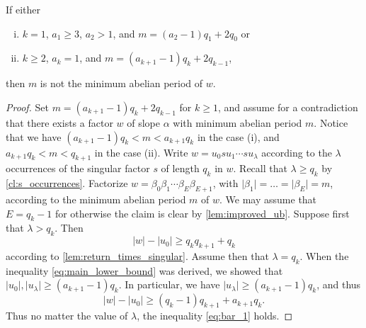 \documentclass[a4paper,fleqn]{article}
\providecommand{\abs}[1]{\lvert#1\rvert}
\begin{document}
  \begin{lemma}\label{lem:cases_2_3}
    If either
    \begin{enumerate}[(i)]
      \item $k = 1$, $a_1 \geq 3$, $a_2 > 1$, and $m = (a_2 - 1)q_1 + 2q_0$ or
      \item $k \geq 2$, $a_k = 1$, and $m = (a_{k+1} - 1)q_k + 2q_{k-1}$,
    \end{enumerate}
    then $m$ is not the minimum abelian period of $w$.
  \end{lemma}
  \begin{proof}
    Set $m = (a_{k+1} - 1)q_k + 2q_{k-1}$ for $k \geq 1$, and assume for a contradiction that there exists a factor $w$
    of slope $\alpha$ with minimum abelian period $m$. Notice that we have $(a_{k+1} - 1)q_k < m < a_{k+1}q_k$ in the
    case (i), and $a_{k+1}q_k < m < q_{k+1}$ in the case (ii). Write $w = u_0 s u_1 \dotsm s u_\lambda$ according to
    the $\lambda$ occurrences of the singular factor $s$ of length $q_k$ in $w$. Recall that $\lambda \geq q_k$ by
    \autoref{cl:s_occurrences}. Factorize $w = \beta_0 \beta_1 \dotsm \beta_E \beta_{E+1}$, with
    $\abs{\beta_1} = \ldots = \abs{\beta_E} = m$, according to the minimum abelian period $m$ of $w$. We may assume
    that $E = q_k - 1$ for otherwise the claim is clear by \autoref{lem:improved_ub}. Suppose first that
    $\lambda > q_k$. Then
    \begin{equation*}
      \abs{w} - \abs{u_0} \geq q_k q_{k+1} + q_k
    \end{equation*}
    according to \autoref{lem:return_times_singular}. Assume then that $\lambda = q_k$. When the inequality
    \eqref{eq:main_lower_bound} was derived, we showed that $\abs{u_0}, \abs{u_\lambda} \geq (a_{k+1} - 1)q_k$.
    In particular, we have $\abs{u_\lambda} \geq (a_{k+1} - 1)q_k$, and thus
    \begin{equation}\label{eq:bar_1}
      \abs{w} - \abs{u_0} \geq (q_k - 1)q_{k+1} + a_{k+1}q_k.
    \end{equation}
    Thus no matter the value of $\lambda$, the inequality \eqref{eq:bar_1} holds.


\end{proof}
\end{document}
